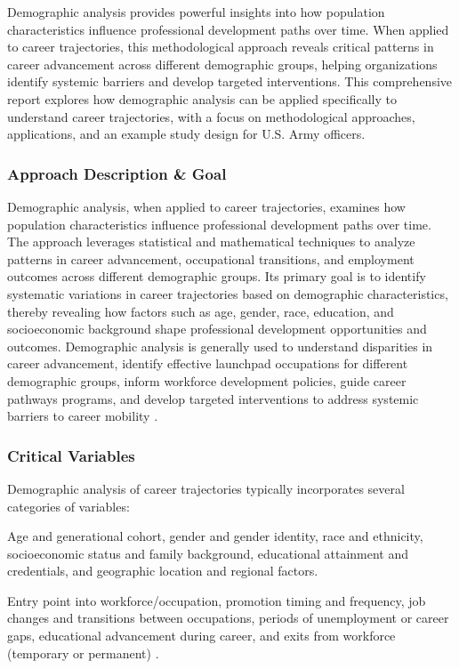 \documentclass[../main.tex]{subfiles}
\begin{document}
Demographic analysis provides powerful insights into how population characteristics influence professional development paths over time. When applied to career trajectories, this methodological approach reveals critical patterns in career advancement across different demographic groups, helping organizations identify systemic barriers and develop targeted interventions. This comprehensive report explores how demographic analysis can be applied specifically to understand career trajectories, with a focus on methodological approaches, applications, and an example study design for U.S. Army officers.

\subsubsection{Approach Description \& Goal}

Demographic analysis, when applied to career trajectories, examines how population characteristics influence professional development paths over time. The approach leverages statistical and mathematical techniques to analyze patterns in career advancement, occupational transitions, and employment outcomes across different demographic groups. Its primary goal is to identify systematic variations in career trajectories based on demographic characteristics, thereby revealing how factors such as age, gender, race, education, and socioeconomic background shape professional development opportunities and outcomes. Demographic analysis is generally used to understand disparities in career advancement, identify effective launchpad occupations for different demographic groups, inform workforce development policies, guide career pathways programs, and develop targeted interventions to address systemic barriers to career mobility \parencite{dol2023building,nataraj2018career}.

\subsubsection{Critical Variables}

Demographic analysis of career trajectories typically incorporates several categories of variables:

Age and generational cohort, gender and gender identity, race and ethnicity, socioeconomic status and family background, educational attainment and credentials, and geographic location and regional factors.

Entry point into workforce/occupation, promotion timing and frequency, job changes and transitions between occupations, periods of unemployment or career gaps, educational advancement during career, and exits from workforce (temporary or permanent) \parencite{nataraj2018career}.
\end{document}
